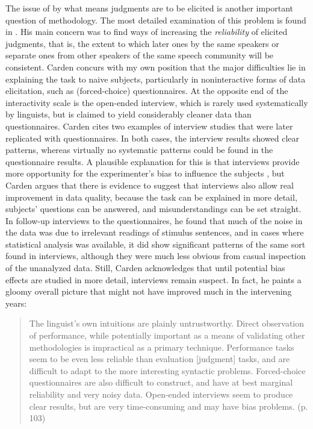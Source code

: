  The issue of by what means judgments are to be elicited is another important question of methodology. The most detailed examination of this problem is found in \citet{Carden1976b}. His main concern was to find ways of increasing the \textit{reliability} of elicited judgments, that is, the extent to which later ones by the same speakers or separate ones from other speakers of the same speech community will be consistent. Carden concurs with my own position that the major difficulties lie in explaining the task to naive subjects, particularly in noninteractive forms of data elicitation, such as (forced-choice) questionnaires. At the opposite end of the interactivity scale is the open-ended interview, which is rarely used systematically by linguists, but is claimed to yield considerably cleaner data than questionnaires. Carden cites two examples of interview studies that were later replicated with questionnaires. In both cases, the interview results showed clear patterns, whereas virtually no systematic patterns could be found in the questionnaire results. A plausible explanation for this is that interviews provide more opportunity for the experimenter's bias to influence the subjects \citep{Newmeyer1983}, but Carden argues that there is evidence to suggest that interviews also allow real improvement in data quality, because the task can be explained in more detail, subjects' questions can be answered, and misunderstandings can be set straight. In follow-up interviews to the questionnaires, he found that much of the noise in the data was due to irrelevant readings of stimulus sentences, and in cases where statistical analysis was available, it did show significant patterns of the same sort found in interviews, although they were much less obvious from casual inspection of the unanalyzed data. Still, Carden acknowledges that until potential bias effects are studied in more detail, interviews remain suspect. In fact, he paints a gloomy overall picture that might not have improved much in the intervening years:

 \begin{quote}
 The linguist's own intuitions are plainly untrustworthy. Direct observation of performance, while potentially important as a means of validating other methodologies is impractical as a primary technique. Performance tasks seem to be even less reliable than evaluation [judgment] tasks, and are difficult to adapt to the more interesting syntactic problems. Forced-choice questionnaires are also difficult to construct, and have at best marginal reliability and very noisy data. Open-ended interviews seem to produce clear results, but are very time-consuming and may have bias problems. (p. 103)
 \end{quote}


